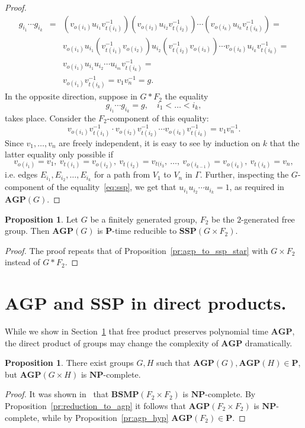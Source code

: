 \documentclass[10pt]{amsart}
\theoremstyle{definition}
\newtheorem{proposition}[theorem]{Proposition}
\def\P{{\mathbf{P}}}
\def\NP{{\mathbf{NP}}}
\def\SSP{{\mathbf{SSP}}}
\def\BSMP{{\mathbf{BSMP}}}
\def\AGP{{\mathbf{AGP}}}
\begin{document}
\begin{proof}
\begin{eqnarray*}
g_{i_1}\cdots g_{i_k}&=&(v_{o(i_1)}u_{i_1}v_{t(i_1)}^{-1})
(v_{o(i_2)}u_{i_2}v_{t(i_2)}^{-1})\cdots (v_{o(i_k)}u_{i_k}v_{t(i_k)}^{-1})=\\
&&v_{o(i_1)}u_{i_1}(v_{t(i_1)}^{-1}
v_{o(i_2)})u_{i_2}(v_{t(i_2)}^{-1}v_{o(i_3)})\cdots v_{o(i_k)}u_{i_k}v_{t(i_k)}^{-1}=\\
&&v_{o(i_1)}u_{i_1}u_{i_2}\cdots u_{i_m}v_{t(i_k)}^{-1}=\\
&&v_{o(i_1)}v_{t(i_k)}^{-1}=v_{1}v_{n}^{-1}=g.
\end{eqnarray*}
In the opposite direction, suppose in $G\ast F_2$ the equality
\begin{equation}\label{eq:ssp}
g_{i_1}\cdots g_{i_k}=g,\quad i_1<\ldots<i_k,
\end{equation}
takes place. Consider the $F_2$-component of this equality:
$$
v_{o(i_1)}v_{t(i_1)}^{-1}\cdot v_{o(i_2)}v_{t(i_2)}^{-1}\cdots v_{o(i_k)}v_{t(i_k)}^{-1}=v_1v_n^{-1}.
$$
Since $v_1,\ldots, v_n$ are freely independent, it is easy to see by induction on $k$ that the latter equality only possible if
$$
v_{o(i_1)}=v_1,\ v_{t(i_1)}=v_{o(i_2)},\ v_{t(i_2)}=v_{t(i_3},\ \ldots,\ v_{o(i_{k-1})}=v_{o(i_k)},\ v_{t(i_k)}=v_n,
$$
i.e. edges $E_{i_1}, E_{i_2},\ldots, E_{i_k}$ for a path from $V_1$ to $V_n$ in $\Gamma$. Further, inspecting the $G$-component of the equality~\eqref{eq:ssp}, we get that $u_{i_1}u_{i_2}\cdots u_{i_k}=1$, as required in $\AGP(G)$.
\end{proof}

\begin{proposition}\label{pr:agp_to_ssp_cross}
Let $G$ be a finitely generated group, $F_2$ be the $2$-generated free group. Then $\AGP(G)$ is $\P$-time reducible to $\SSP(G\times F_2)$.
\end{proposition}
\begin{proof}
The proof repeats that of Proposition~\ref{pr:agp_to_ssp_star} with $G\times F_2$ instead of $G\ast F_2$.
\end{proof}

\section{$\AGP$ and $\SSP$ in direct products.}\label{sec:direct_prod}
While we show in Section~\ref{sec:direct_prod} that free product preserves polynomial time $\AGP$, the direct product of groups may change the complexity of $\AGP$ dramatically.
\begin{proposition}\label{pr:agp_cross}
There exist groups $G,H$ such that $\AGP(G),\AGP(H)\in\P$, but $\AGP(G\times H)$ is $\NP$-complete.
\end{proposition}
\begin{proof}
It was shown in~\cite[Theorem 7.4]{Miasnikov-Nikolaev-Ushakov:2014a} that $\BSMP(F_2\times F_2)$ is $\NP$-complete. By Proposition~\ref{pr:reduction_to_agp} it follows that $\AGP(F_2\times F_2)$ is $\NP$-complete, while by Proposition~\ref{pr:agp_hyp} $\AGP(F_2)\in\P$.
\end{proof}
\end{document}
